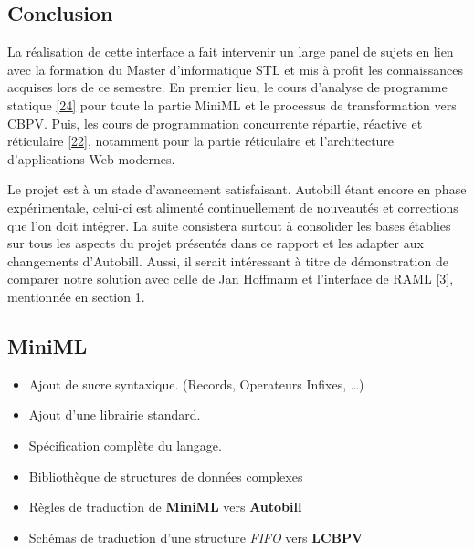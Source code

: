\documentclass[12pt]{article}
\begin{document}
\hypertarget{conclusion}{%
      \subsection{Conclusion}\label{conclusion}}

La réalisation de cette interface a fait intervenir un large panel de
sujets en lien avec la formation du Master d'informatique STL et mis à
profit les connaissances acquises lors de ce semestre. En premier lieu,
le cours d'analyse de programme statique
\protect\hyperlink{ref-APS}{{[}24{]}} pour toute la partie MiniML et le
processus de transformation vers CBPV. Puis, les cours de programmation
concurrente répartie, réactive et réticulaire
\protect\hyperlink{ref-PC3R}{{[}22{]}}, notamment pour la partie
réticulaire et l'architecture d'applications Web modernes.

Le projet est à un stade d'avancement satisfaisant. Autobill étant
encore en phase expérimentale, celui-ci est alimenté continuellement de
nouveautés et corrections que l'on doit intégrer. La suite consistera
surtout à consolider les bases établies sur tous les aspects du projet
présentés dans ce rapport et les adapter aux changements d'Autobill.
Aussi, il serait intéressant à titre de démonstration de comparer notre
solution avec celle de Jan Hoffmann et l'interface de RAML
\protect\hyperlink{ref-RAML}{{[}3{]}}, mentionnée en section 1.

\hypertarget{miniml-1}{%
      \subsection{MiniML}\label{miniml-1}}

\begin{itemize}
      \tightlist
      \item
            Ajout de sucre syntaxique. (Records, Operateurs Infixes, \ldots)
      \item
            Ajout d'une librairie standard.
      \item
            Spécification complète du langage.
      \item
            Bibliothèque de structures de données complexes
      \item
            Règles de traduction de \textbf{MiniML} vers \textbf{Autobill}
      \item
            Schémas de traduction d'une structure \emph{FIFO} vers \textbf{LCBPV}
\end{itemize}
\end{document}
